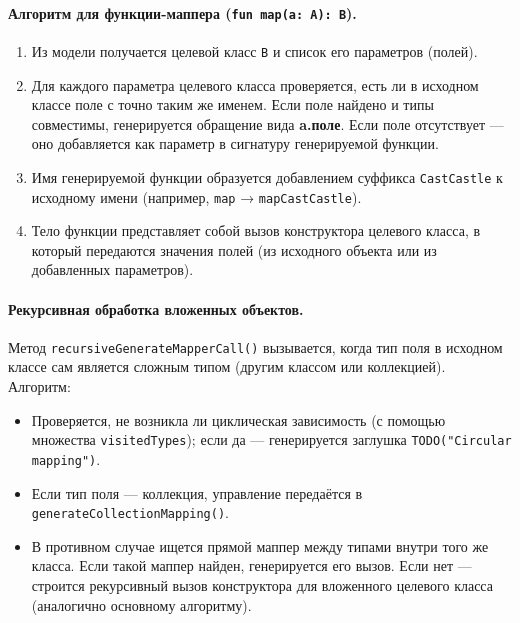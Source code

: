 \paragraph{Алгоритм для функции-маппера (\texttt{fun map(a: A): B}).}
\begin{enumerate}
    \item Из модели получается целевой класс \texttt{B} и список его параметров (полей).
    \item Для каждого параметра целевого класса проверяется, есть ли в исходном классе поле с точно таким же именем. Если поле найдено и типы совместимы, генерируется обращение вида \textbf{a.поле}. Если поле отсутствует — оно добавляется как параметр в сигнатуру генерируемой функции.
    \item Имя генерируемой функции образуется добавлением суффикса \texttt{CastCastle} к исходному имени (например, \texttt{map} → \texttt{mapCastCastle}).
    \item Тело функции представляет собой вызов конструктора целевого класса, в который передаются значения полей (из исходного объекта или из добавленных параметров).
\end{enumerate}

\paragraph{Рекурсивная обработка вложенных объектов.}
Метод \texttt{recursiveGenerateMapperCall()} вызывается, когда тип поля в исходном классе сам является сложным типом (другим классом или коллекцией). Алгоритм:
\begin{itemize}
    \item Проверяется, не возникла ли циклическая зависимость (с помощью множества \texttt{visitedTypes}); если да — генерируется заглушка \texttt{TODO("Circular mapping")}.
    \item Если тип поля — коллекция, управление передаётся в \texttt{generateCollectionMapping()}.
    \item В противном случае ищется прямой маппер между типами внутри того же класса. Если такой маппер найден, генерируется его вызов. Если нет — строится рекурсивный вызов конструктора для вложенного целевого класса (аналогично основному алгоритму).
\end{itemize}

